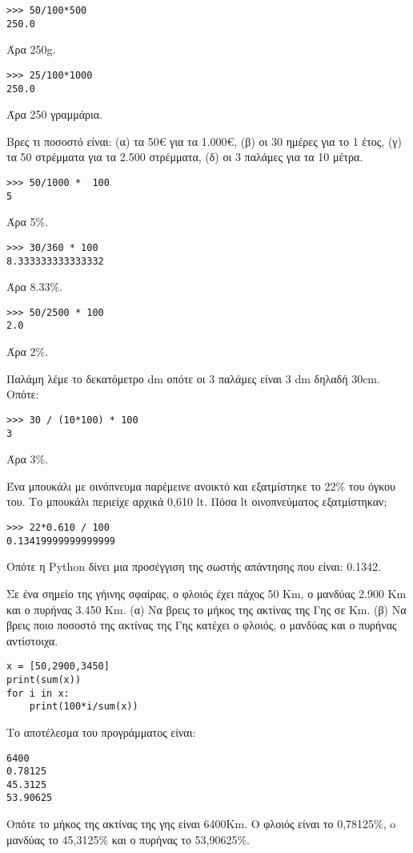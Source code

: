 \begin{lstlisting}
>>> 50/100*500
250.0
\end{lstlisting}
Άρα 250g.

\begin{lstlisting}
>>> 25/100*1000
250.0
\end{lstlisting}
Άρα 250 γραμμάρια.

\begin{exercise}
Βρες     τι  ποσοστό     είναι:  (α)     τα  50€    για     τα  1.000€,  (β)     οι  30  ημέρες  για  το   1   έτος,
(γ) τα  50  στρέμματα   για τα  2.500   στρέμματα,  (δ) οι  3   παλάμες για τα  10  μέτρα.
\end{exercise}
\begin{lstlisting}
>>> 50/1000 *  100
5
\end{lstlisting}
Άρα 5\%.

\begin{lstlisting}
>>> 30/360 * 100
8.333333333333332
\end{lstlisting}
Άρα 8.33\%.

\begin{lstlisting}
>>> 50/2500 * 100
2.0
\end{lstlisting}
Άρα 2\%.

Παλάμη λέμε το δεκατόμετρο dm οπότε οι 3 παλάμες είναι 3 dm δηλαδή 30cm.
Οπότε:
\begin{lstlisting}
>>> 30 / (10*100) * 100
3
\end{lstlisting}
Άρα 3\%.

\begin{exercise}
Ένα  μπουκάλι    με  οινόπνευμα  παρέμεινε   ανοικτό και εξατμίστηκε το  22\% του όγκου   
του.    Το  μπουκάλι    περιείχε    αρχικά  0,610   lt. Πόσα    lt  οινοπνεύματος   εξατμίστηκαν;
\end{exercise}

\begin{lstlisting}
>>> 22*0.610 / 100
0.13419999999999999
\end{lstlisting}
Οπότε η Python δίνει μια προσέγγιση της σωστής απάντησης που είναι:
0.1342.

\begin{exercise}
Σε  ένα σημείο  της γήινης  σφαίρας,    ο   φλοιός  έχει    πάχος   50  Km, ο   
μανδύας 2.900   Km  και ο   πυρήνας 3.450   Km. (α) Να  βρεις   το  μήκος   
της ακτίνας της Γης σε  Km. (β) Να  βρεις   ποιο    ποσοστό της ακτίνας 
της Γης κατέχει ο   φλοιός, ο   μανδύας και ο   πυρήνας αντίστοιχα.
\end{exercise}
\begin{lstlisting}
x = [50,2900,3450]
print(sum(x))
for i in x:
    print(100*i/sum(x))
\end{lstlisting}
Το αποτέλεσμα του προγράμματος είναι:
\begin{lstlisting}
6400
0.78125
45.3125
53.90625
\end{lstlisting}
Οπότε το μήκος της ακτίνας της γης είναι 6400Km.
Ο φλοιός είναι το 0,78125\%, o μανδύας το 45,3125\% και ο πυρήνας το 53,90625\%.


